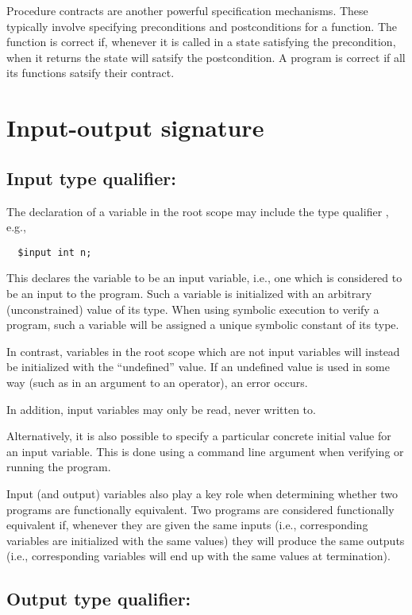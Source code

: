 Procedure contracts are another powerful specification mechanisms.
These typically involve specifying preconditions and postconditions
for a function. The function is correct if, whenever it is called in a
state satisfying the precondition, when it returns the state will
satsify the postcondition. A program is correct if all its functions
satsify their contract.

\section{Input-output signature}

\subsection{Input type qualifier: \cinput}

The declaration of a variable in the root scope may
include the type qualifier \cinput, e.g.,
\begin{verbatim}
  $input int n;
\end{verbatim}
This declares the variable to be an input variable, i.e., one which is
considered to be an input to the program.  Such a variable is
initialized with an arbitrary (unconstrained) value of its type.  When
using symbolic execution to verify a program, such a variable will be
assigned a unique symbolic constant of its type.

In contrast, variables in the root scope which are not input variables
will instead be initialized with the ``undefined'' value.  If an
undefined value is used in some way (such as in an argument to an
operator), an error occurs.

In addition, input variables may only be read, never written to.

Alternatively, it is also possible to specify a particular concrete
initial value for an input variable.  This is done using a command
line argument when verifying or running the program.

Input (and output) variables also play a key role when determining
whether two programs are functionally equivalent.  Two programs are
considered functionally equivalent if, whenever they are given the
same inputs (i.e., corresponding \cinput{} variables are initialized
with the same values) they will produce the same outputs (i.e.,
corresponding \coutput{} variables will end up with the same values at
termination).

\subsection{Output type qualifier: \coutput}

